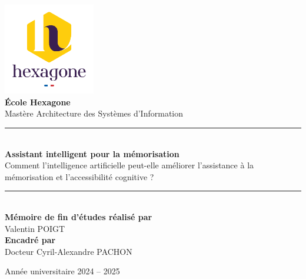 \documentclass[12pt,a4paper]{report}
\begin{document}
\justifying %
\onehalfspacing %
\addtolength{\parskip}{6pt} %
\setlength{\parindent}{15pt} %

\begin{titlepage}
    \begin{center}
        \vspace*{\fill}

                \includegraphics[width=0.3\textwidth]{images/logo.png}\\[1cm]
                
                {\Large \textbf{École Hexagone}}\\[0.5cm]
                {\small Mastère Architecture des Systèmes d'Information}\\[0.5cm]

                \rule{\linewidth}{0.5mm}\\[1cm]
                
                {\LARGE \textbf{Assistant intelligent pour la mémorisation}} \\[0.5cm]
                {\Large Comment l'intelligence artificielle peut-elle améliorer l'assistance à la mémorisation et l'accessibilité cognitive ?}\\[0.5cm]

                \rule{\linewidth}{0.5mm}\\[1cm]
                
                \textbf{Mémoire de fin d'études réalisé par}\\
                {\Large Valentin POIGT}\\[1cm]
                
                \textbf{Encadré par}\\
                {\Large Docteur Cyril-Alexandre PACHON}\\[0.5cm]

                \vspace*{\fill}
                
                {\Large Année universitaire 2024 – 2025}
        \vspace*{\fill}
    \end{center}
\end{titlepage}
\end{document}
